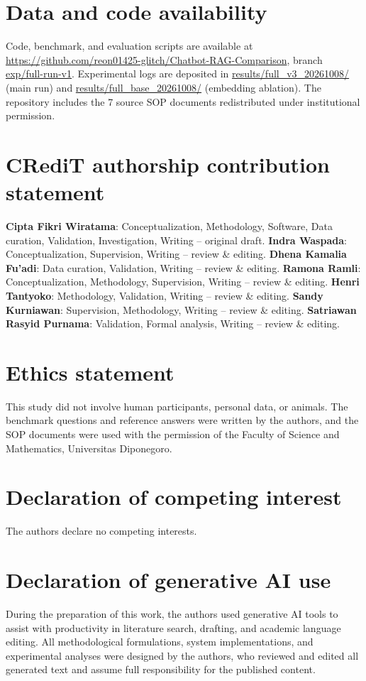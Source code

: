 \documentclass[preprint,10pt]{elsarticle}
\begin{document}
\section*{Data and code availability}
Code, benchmark, and evaluation scripts are available at \url{https://github.com/reon01425-glitch/Chatbot-RAG-Comparison}, branch \url{exp/full-run-v1}. Experimental logs are deposited in \url{results/full_v3_20261008/} (main run) and \url{results/full_base_20261008/} (embedding ablation). The repository includes the 7 source SOP documents redistributed under institutional permission.

\section*{CRediT authorship contribution statement}
\textbf{Cipta Fikri Wiratama}: Conceptualization, Methodology, Software, Data curation, Validation, Investigation, Writing -- original draft. \textbf{Indra Waspada}: Conceptualization, Supervision, Writing -- review \& editing. \textbf{Dhena Kamalia Fu'adi}: Data curation, Validation, Writing -- review \& editing. \textbf{Ramona Ramli}: Conceptualization, Methodology, Supervision, Writing -- review \& editing. \textbf{Henri Tantyoko}: Methodology, Validation, Writing -- review \& editing. \textbf{Sandy Kurniawan}: Supervision, Methodology, Writing -- review \& editing. \textbf{Satriawan Rasyid Purnama}: Validation, Formal analysis, Writing -- review \& editing.

\section*{Ethics statement}
This study did not involve human participants, personal data, or animals. The benchmark questions and reference answers were written by the authors, and the SOP documents were used with the permission of the Faculty of Science and Mathematics, Universitas Diponegoro.

\section*{Declaration of competing interest}
The authors declare no competing interests.

\section*{Declaration of generative AI use}
During the preparation of this work, the authors used generative AI tools to assist with productivity in literature search, drafting, and academic language editing. All methodological formulations, system implementations, and experimental analyses were designed by the authors, who reviewed and edited all generated text and assume full responsibility for the published content.
\end{document}

